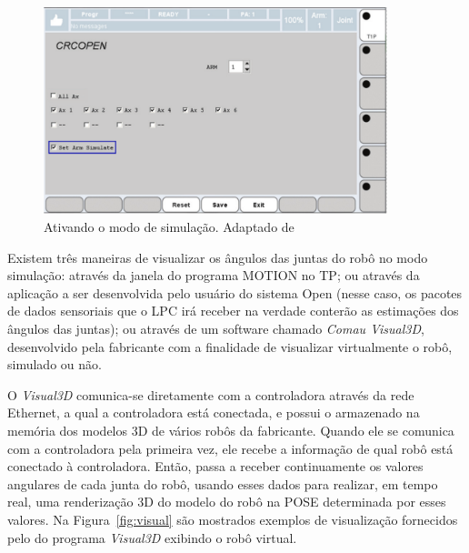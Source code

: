         \begin{figure}[!htb] 
            \centering
            \includegraphics[width=10cm]{imagens/Softwares/habilitar-simu.png}%
            \small
            \centering
            \caption{Ativando o modo de simulação. Adaptado de~\cite{Open:Manual}}
            \label{fig:habilitar_simu}
        \end{figure}
        
        Existem três maneiras de visualizar os ângulos das juntas do robô no modo simulação: através da janela do programa MOTION no \ac{TP}; ou através da aplicação a ser desenvolvida pelo usuário do sistema Open (nesse caso, os pacotes de dados sensoriais que o \ac{LPC} irá receber na verdade conterão as estimações dos ângulos das juntas); ou através de um software chamado \textit{Comau Visual3D}, desenvolvido pela fabricante com a finalidade de visualizar virtualmente o robô, simulado ou não.
        
        O \textit{Visual3D} comunica-se diretamente com a controladora através da rede Ethernet, a qual a controladora está conectada, e possui o armazenado na memória dos modelos 3D de vários robôs da fabricante. Quando ele se comunica com a controladora pela primeira vez, ele recebe a informação de qual robô está conectado à controladora. Então, passa a receber continuamente os valores angulares de cada junta do robô, usando esses dados para realizar, em tempo real, uma renderização 3D do modelo do robô na \ac{POSE} determinada por esses valores. Na Figura~\ref{fig:visual} são mostrados exemplos de visualização fornecidos pelo do programa \textit{Visual3D} exibindo o robô virtual.
        
